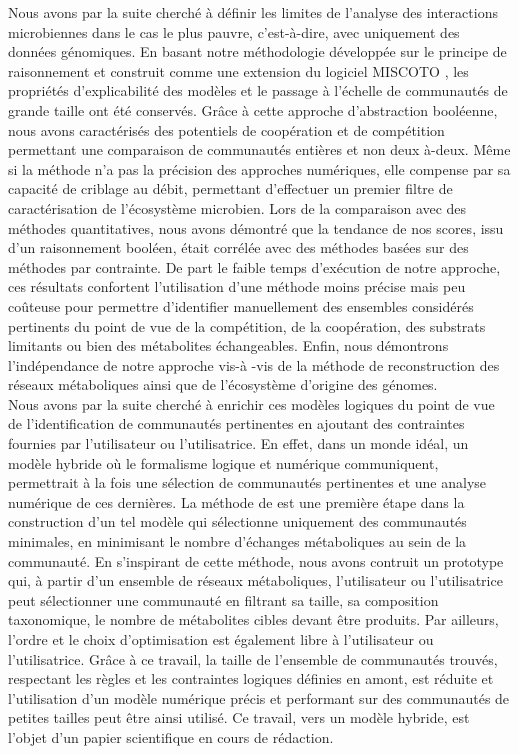 \documentclass[../main.tex]{subfiles}
\begin{document}
Nous avons par la suite cherché à définir les limites de l'analyse des interactions microbiennes dans le cas le plus pauvre, c'est-à-dire, avec uniquement des données génomiques. En basant notre méthodologie développée sur le principe de raisonnement et construit comme une extension du logiciel MISCOTO \citep{Frioux2018}, les propriétés  d'explicabilité des modèles et le passage à l'échelle de communautés de grande taille ont été conservés. Grâce à cette approche d'abstraction booléenne, nous avons caractérisés des potentiels de coopération et de compétition permettant une comparaison de communautés entières et non deux à-deux. Même si la méthode n'a pas la précision des approches numériques, elle compense par sa capacité de criblage au débit, permettant d'effectuer un premier filtre de caractérisation de l'écosystème microbien. Lors de la comparaison avec des méthodes quantitatives, nous avons démontré que la tendance de nos scores, issu d'un raisonnement booléen, était corrélée avec des méthodes basées sur des méthodes par contrainte. De part le faible temps d'exécution de notre approche, ces résultats confortent l'utilisation d'une méthode moins précise mais peu coûteuse pour permettre d'identifier manuellement des ensembles considérés pertinents du point de vue de la compétition, de la coopération, des substrats limitants ou bien des métabolites échangeables. Enfin, nous démontrons l'indépendance de notre approche vis-à -vis de la méthode de reconstruction des réseaux métaboliques ainsi que de l'écosystème d'origine des génomes. \\

Nous avons par la suite cherché à enrichir ces modèles logiques du point de vue de l'identification de communautés pertinentes en ajoutant des contraintes fournies par l'utilisateur ou l'utilisatrice. En effet, dans un monde idéal, un modèle hybride où le formalisme logique et numérique communiquent, permettrait à la fois une sélection de communautés pertinentes et une analyse numérique de ces dernières. La méthode de \citep{Frioux2018} est une première étape dans la construction d'un tel modèle qui sélectionne uniquement des communautés minimales, en minimisant le nombre d'échanges métaboliques au sein de la communauté. En s'inspirant de cette méthode, nous avons contruit un prototype qui, à partir d'un ensemble de réseaux métaboliques, l'utilisateur ou l'utilisatrice peut sélectionner une communauté en filtrant sa taille, sa composition taxonomique, le nombre de métabolites cibles devant être produits. Par ailleurs, l'ordre et le choix d'optimisation est également libre à l'utilisateur ou l'utilisatrice. Grâce à ce travail, la taille de l'ensemble de communautés trouvés, respectant les règles et les contraintes logiques définies en amont, est réduite et l'utilisation d'un modèle numérique précis et performant sur des communautés de petites tailles peut être ainsi utilisé. Ce travail, vers un modèle hybride, est l'objet d'un papier scientifique en cours de rédaction.
\end{document}
